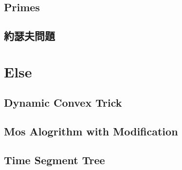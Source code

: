 \subsection{Primes}

\subsection{約瑟夫問題}


\section{Else}
\subsection{Dynamic Convex Trick}

\subsection{Mos Alogrithm with Modification}

\subsection{Time Segment Tree}

